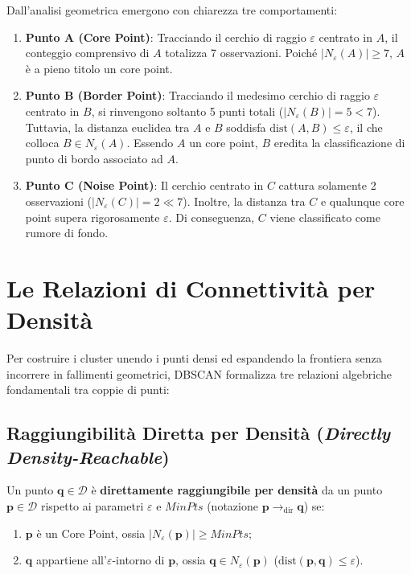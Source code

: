 Dall'analisi geometrica emergono con chiarezza tre comportamenti:
\begin{enumerate}
    \item \textbf{Punto A (Core Point)}: Tracciando il cerchio di raggio $\varepsilon$ centrato in $A$, il conteggio comprensivo di $A$ totalizza 7 osservazioni. Poiché $|N_\varepsilon(A)| \ge 7$, $A$ è a pieno titolo un core point.
    \item \textbf{Punto B (Border Point)}: Tracciando il medesimo cerchio di raggio $\varepsilon$ centrato in $B$, si rinvengono soltanto 5 punti totali ($|N_\varepsilon(B)| = 5 < 7$). Tuttavia, la distanza euclidea tra $A$ e $B$ soddisfa $\mathrm{dist}(A, B) \le \varepsilon$, il che colloca $B \in N_\varepsilon(A)$. Essendo $A$ un core point, $B$ eredita la classificazione di punto di bordo associato ad $A$.
    \item \textbf{Punto C (Noise Point)}: Il cerchio centrato in $C$ cattura solamente 2 osservazioni ($|N_\varepsilon(C)| = 2 \ll 7$). Inoltre, la distanza tra $C$ e qualunque core point supera rigorosamente $\varepsilon$. Di conseguenza, $C$ viene classificato come rumore di fondo.
\end{enumerate}

\section{Le Relazioni di Connettività per Densità}
\label{sec:dm-dbscan-reachability-connectivity}

Per costruire i cluster unendo i punti densi ed espandendo la frontiera senza incorrere in fallimenti geometrici, DBSCAN formalizza tre relazioni algebriche fondamentali tra coppie di punti:

\subsection{Raggiungibilità Diretta per Densità (\textit{Directly Density-Reachable})}

\begin{definition}
Un punto $\mathbf{q} \in \mathcal{D}$ è \textbf{direttamente raggiungibile per densità} da un punto $\mathbf{p} \in \mathcal{D}$ rispetto ai parametri $\varepsilon$ e $MinPts$ (notazione $\mathbf{p} \to_{\mathrm{dir}} \mathbf{q}$) se:
\begin{enumerate}
    \item $\mathbf{p}$ è un Core Point, ossia $|N_\varepsilon(\mathbf{p})| \ge MinPts$;
    \item $\mathbf{q}$ appartiene all'$\varepsilon$-intorno di $\mathbf{p}$, ossia $\mathbf{q} \in N_\varepsilon(\mathbf{p})$ ($\mathrm{dist}(\mathbf{p}, \mathbf{q}) \le \varepsilon$).
\end{enumerate}
\end{definition}

